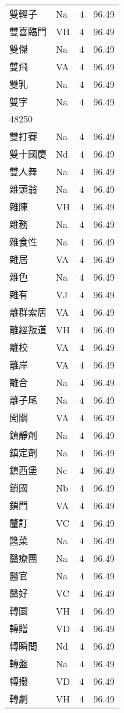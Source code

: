 \documentclass[twocolumn]{book}
\begin{document}
\begin{supertabular}{llrr}
雙輕子 & Na & 4 &  96.49\\
雙喜臨門 & VH & 4 &  96.49\\
雙傑 & Na & 4 &  96.49\\
雙飛 & VA & 4 &  96.49\\
雙乳 & Na & 4 &  96.49\\
雙字 & Na & 4 &  96.49\\
48250\\
雙打賽 & Na & 4 &  96.49\\
雙十國慶 & Nd & 4 &  96.49\\
雙人舞 & Na & 4 &  96.49\\
雜頭翁 & Na & 4 &  96.49\\
雜陳 & VH & 4 &  96.49\\
雜務 & Na & 4 &  96.49\\
雜食性 & Na & 4 &  96.49\\
雜居 & VA & 4 &  96.49\\
雜色 & Na & 4 &  96.49\\
雜有 & VJ & 4 &  96.49\\
離群索居 & VA & 4 &  96.49\\
離經叛道 & VH & 4 &  96.49\\
離校 & VA & 4 &  96.49\\
離岸 & VA & 4 &  96.49\\
離合 & Na & 4 &  96.49\\
離子尾 & Na & 4 &  96.49\\
闖關 & VA & 4 &  96.49\\
鎮靜劑 & Na & 4 &  96.49\\
鎮定劑 & Na & 4 &  96.49\\
鎮西堡 & Nc & 4 &  96.49\\
鎖國 & Nb & 4 &  96.49\\
鎖門 & VA & 4 &  96.49\\
釐訂 & VC & 4 &  96.49\\
醬菜 & Na & 4 &  96.49\\
醫療團 & Na & 4 &  96.49\\
醫官 & Na & 4 &  96.49\\
醫好 & VC & 4 &  96.49\\
轉圜 & VH & 4 &  96.49\\
轉贈 & VD & 4 &  96.49\\
轉瞬間 & Nd & 4 &  96.49\\
轉盤 & Na & 4 &  96.49\\
轉撥 & VD & 4 &  96.49\\
轉劇 & VH & 4 &  96.49\\

\end{supertabular}
\end{document}
